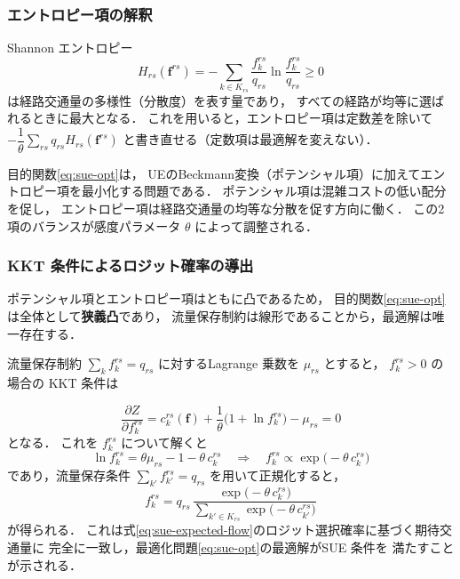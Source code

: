 \subsubsection*{エントロピー項の解釈}

Shannon エントロピー
\begin{equation}
  H_{rs}(\boldsymbol{f}^{rs})
    = -\sum_{k \in K_{rs}} \frac{f_k^{rs}}{q_{rs}}
        \ln \frac{f_k^{rs}}{q_{rs}}
      \geq 0
  \label{eq:entropy}
\end{equation}
は経路交通量の多様性（分散度）を表す量であり，
すべての経路が均等に選ばれるときに最大となる．
これを用いると，エントロピー項は定数差を除いて
$-\dfrac{1}{\theta}\sum_{rs} q_{rs} H_{rs}(\boldsymbol{f}^{rs})$
と書き直せる（定数項は最適解を変えない）．

目的関数\eqref{eq:sue-opt}は，
UEのBeckmann変換（ポテンシャル項）に加えてエントロピー項を最小化する問題である．
ポテンシャル項は混雑コストの低い配分を促し，
エントロピー項は経路交通量の均等な分散を促す方向に働く．
この2項のバランスが感度パラメータ $\theta$ によって調整される．

\subsubsection*{KKT 条件によるロジット確率の導出}

ポテンシャル項とエントロピー項はともに凸であるため，
目的関数\eqref{eq:sue-opt}は全体として\textbf{狭義凸}であり，
流量保存制約は線形であることから，最適解は唯一存在する\cite{Fisk1980}．

流量保存制約 $\sum_k f_k^{rs} = q_{rs}$ に対するLagrange 乗数を $\mu_{rs}$ とすると，
$f_k^{rs} > 0$ の場合の KKT 条件は

\begin{equation}
  \frac{\partial Z}{\partial f_k^{rs}}
    = c_k^{rs}(\boldsymbol{f})
      + \frac{1}{\theta}\bigl(1 + \ln f_k^{rs}\bigr)
      - \mu_{rs}
    = 0
  \label{eq:sue-kkt}
\end{equation}
となる．
これを $f_k^{rs}$ について解くと
\[
  \ln f_k^{rs}
    = \theta \mu_{rs} - 1 - \theta\, c_k^{rs}
  \quad \Longrightarrow \quad
  f_k^{rs} \propto \exp\!\bigl(-\theta\, c_k^{rs}\bigr)
\]
であり，流量保存条件 $\sum_{k'} f_{k'}^{rs} = q_{rs}$ を用いて正規化すると，
\begin{equation}
  f_k^{rs} = q_{rs}\,
    \frac{\exp\!\bigl(-\theta\, c_k^{rs}\bigr)}
         {\displaystyle
          \sum_{k' \in K_{rs}} \exp\!\bigl(-\theta\, c_{k'}^{rs}\bigr)}
  \label{eq:sue-kkt-result}
\end{equation}
が得られる．
これは式\eqref{eq:sue-expected-flow}のロジット選択確率に基づく期待交通量に
完全に一致し，最適化問題\eqref{eq:sue-opt}の最適解がSUE 条件を
満たすことが示される．

